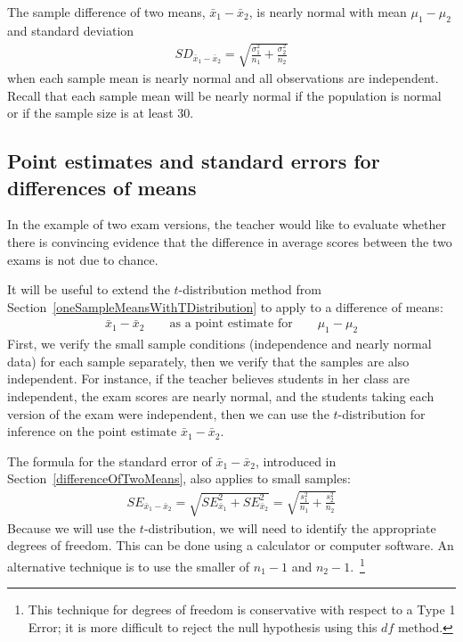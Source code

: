 
\begin{termBox}{
The sample difference of two means, $\bar{x}_1 - \bar{x}_2$, is nearly normal with mean $\mu_{1}-\mu_{2}$ and standard deviation
\begin{eqnarray}
SD_{\bar{x}_{1} - \bar{x}_{2}} = \sqrt{\frac{\sigma_1^2}{n_1} + \frac{\sigma_2^2}{n_2}}
\label{seOfDifferenceInMeans}
\end{eqnarray}
when each sample mean is nearly normal and all observations are independent. Recall that each sample mean will be nearly normal if the population is normal or if the sample size is at least 30.}
\end{termBox}


\subsection{Point estimates and standard errors for differences of means}
In the example of two exam versions, the teacher would like to evaluate whether there is convincing evidence that the difference in average scores between the two exams is not due to chance.

It will be useful to extend the $t$-distribution method from Section~\ref{oneSampleMeansWithTDistribution} to apply to a difference of means:
\begin{eqnarray*}
\bar{x}_1 - \bar{x}_2
	\qquad \text{as a point estimate for} \qquad
	\mu_1 - \mu_2
\end{eqnarray*}
First, we verify the small sample conditions (independence and nearly normal data) for each sample separately, then we verify that the samples are also independent. For instance, if the teacher believes students in her class are independent, the exam scores are nearly normal, and the students taking each version of the exam were independent, then we can use the $t$-distribution for inference on the point estimate $\bar{x}_{1} - \bar{x}_{2}$.

The formula for the standard error of $\bar{x}_{1} - \bar{x}_{2}$, introduced in Section~\ref{differenceOfTwoMeans},
also applies to small samples:
\begin{eqnarray}
SE_{\bar{x}_1 - \bar{x}_2}
	= \sqrt{SE_{\bar{x}_1}^2 + SE_{\bar{x}_2}^2}
	 = \sqrt{\frac{s_1^2}{n_1} + \frac{s_2^2}{n_2}} \label{seOfDiffOfTwoMeansInTDistSection}
\end{eqnarray}
Because we will use the $t$-distribution, we will need to identify the appropriate degrees of freedom. This can be done using a calculator or computer software. An alternative technique is to use the smaller of $n_1 - 1$ and $n_2 - 1$.~\footnote{This technique for degrees of freedom is conservative with respect to a Type 1 Error; it is more difficult to reject the null hypothesis using this $df$ method.}

